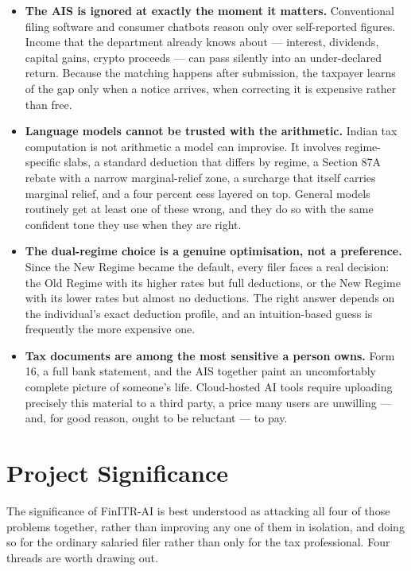 \begin{itemize}
    \item \textbf{The AIS is ignored at exactly the moment it matters.}
          Conventional filing software and consumer chatbots reason only over
          self-reported figures. Income that the department already knows about
          --- interest, dividends, capital gains, crypto proceeds --- can pass
          silently into an under-declared return. Because the matching happens
          after submission, the taxpayer learns of the gap only when a notice
          arrives, when correcting it is expensive rather than free.
    \item \textbf{Language models cannot be trusted with the arithmetic.}
          Indian tax computation is not arithmetic a model can improvise. It
          involves regime-specific slabs, a standard deduction that differs by
          regime, a Section 87A rebate with a narrow marginal-relief zone, a
          surcharge that itself carries marginal relief, and a four percent cess
          layered on top. General models routinely get at least one of these
          wrong, and they do so with the same confident tone they use when they
          are right.
    \item \textbf{The dual-regime choice is a genuine optimisation, not a
          preference.} Since the New Regime became the default, every filer faces
          a real decision: the Old Regime with its higher rates but full
          deductions, or the New Regime with its lower rates but almost no
          deductions. The right answer depends on the individual's exact
          deduction profile, and an intuition-based guess is frequently the more
          expensive one.
    \item \textbf{Tax documents are among the most sensitive a person owns.}
          Form 16, a full bank statement, and the AIS together paint an
          uncomfortably complete picture of someone's life. Cloud-hosted AI tools
          require uploading precisely this material to a third party, a price
          many users are unwilling --- and, for good reason, ought to be
          reluctant --- to pay.
\end{itemize}

\section{Project Significance}
\label{sec:project-significance}

The significance of FinITR-AI is best understood as attacking all four of those
problems together, rather than improving any one of them in isolation, and doing
so for the ordinary salaried filer rather than only for the tax professional.
Four threads are worth drawing out.

